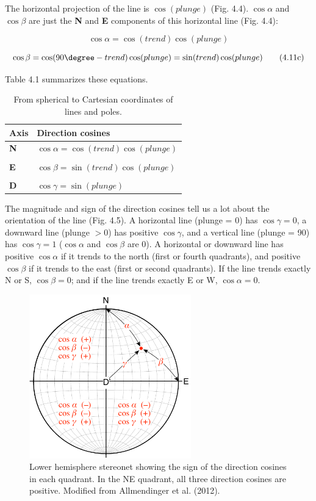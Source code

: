 \documentclass[a4paper , 12pt]{book}
\begin{document}
The horizontal projection of the line is $\cos(plunge)$ (Fig. 4.4). $\cos\alpha$ and $\cos\beta$ are just the \textbf{N} and \textbf{E} components of this horizontal line (Fig. 4.4):

\begin{equation}
    \cos\alpha=\cos(trend)\cos(plunge) \tag{4.11b}
\end{equation}

\begin{equation}
    \cos\beta=\cos(90\degree-trend)\cos(plunge)=\sin(trend)\cos(plunge) \tag{4.11c}
\end{equation}

\newpage
Table 4.1 summarizes these equations.

\begin{table}[H]
\small
\centering
\begin{tabular}{p{1.5cm} p{6cm}} 
 \hline
 \textbf{Axis} & \textbf{Direction cosines} \\
 \hline
 \textbf{N} & $\cos\alpha=\cos(trend)\cos(plunge)$  \\ \\
 \textbf{E} & $\cos\beta=\sin(trend)\cos(plunge)$  \\ \\
 \textbf{D} & $\cos\gamma=\sin(plunge)$  \\
 \hline
\end{tabular}
\caption{From spherical to Cartesian coordinates of lines and poles.}
\label{table4.1}
\end{table}

The magnitude and sign of the direction cosines tell us a lot about the orientation of the line (Fig. 4.5). A horizontal line (plunge = 0) has $\cos\gamma=0$, a downward line (plunge $>0$) has positive $\cos\gamma$, and a vertical line (plunge = 90\degree) has $\cos\gamma=1$ ($\cos\alpha$ and $\cos\beta$ are 0). A horizontal or downward line has positive $\cos\alpha$ if it trends to the north (first or fourth quadrants), and positive $\cos\beta$ if it trends to the east (first or second quadrants). If the line trends exactly N or S, $\cos\beta=0$; and if the line trends exactly E or W, $\cos\alpha=0$. 

\begin{figure}[ht]
    \centering
    \includegraphics[width=7cm]{ch4f5.pdf}
    \caption{Lower hemisphere stereonet showing the sign of the direction cosines in each quadrant. In the NE quadrant, all three direction cosines are positive. Modified from Allmendinger et al. (2012).}
\end{figure}
\end{document}
